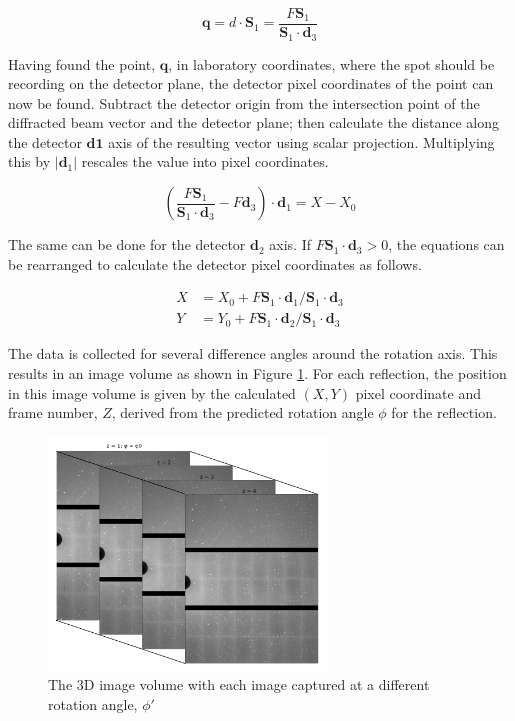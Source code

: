 \documentclass[a4paper,10pt]{article}
\begin{document}
\begin{equation}
  \bm{q} = d \cdot \bm{S}_1 = \frac{F \bm{S}_1} {\bm{S}_1 \cdot \bm{d}_3} 
  \nonumber
\end{equation}

Having found the point, $\bm{q}$, in laboratory coordinates, where the spot 
should be recording on the detector plane, the detector pixel coordinates of the 
point can now be found. Subtract the detector origin from the intersection point 
of the diffracted beam vector and the detector plane; then calculate the 
distance along the detector $\bm{d1}$ axis of the resulting vector using 
scalar projection. Multiplying this by $|\bm{d}_1|$ rescales the value into
pixel coordinates.

\begin{equation}
  \left(\frac{F \bm{S}_1} {\bm{S}_1 \cdot \bm{d}_3} - F \bm{d}_3 \right) 
    \cdot \bm{d}_1 = X - X_0 
  \nonumber
\end{equation}

The same can be done for the detector $\bm{d}_2$ axis. If 
$F \bm{S}_1 \cdot \bm{d}_3 > 0$, the equations can be rearranged to calculate
the detector pixel coordinates as follows.

\begin{equation}
  \begin{aligned}
    X &= X_0 + F \bm{S}_1 \cdot \bm{d}_1 / \bm{S}_1 \cdot \bm{d}_3 \\
    Y &= Y_0 + F \bm{S}_1 \cdot \bm{d}_2 / \bm{S}_1 \cdot \bm{d}_3
  \end{aligned}
\end{equation}

The data is collected for several difference angles around the rotation axis.
This results in an image volume as shown in Figure \ref{image volume}. For each
reflection, the position in this image volume is given by the calculated
$(X, Y)$ pixel coordinate and frame number, $Z$, derived from the predicted 
rotation angle $\phi$ for the reflection.

\begin{figure}
  \centering
  \includegraphics[width=0.66\textwidth]{./Figures/image_volume.png}
  \caption{The 3D image volume with each image captured at a different rotation 
    angle, $\phi'$}
  \label{image volume}
\end{figure}
\end{document}
